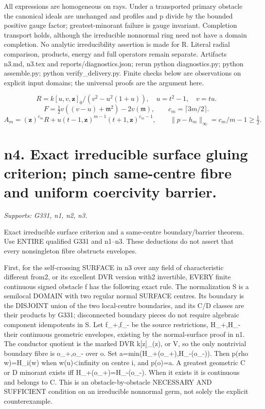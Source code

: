 \documentclass[11pt]{article}
\begin{document}
All expressions are homogeneous on rays. Under a transported primary obstacle the canonical ideals are unchanged and profiles and p divide by the bounded positive gauge factor; greatest-minorant failure is gauge invariant. Completion transport holds, although the irreducible nonnormal ring need not have a domain completion. No analytic irreducibility assertion is made for R. Literal radial comparison, products, energy and full operators remain separate. Artifacts n3.md, n3.tex and reports/diagnostics.json; rerun python diagnostics.py; python assemble.py; python verify\_delivery.py. Finite checks below are observations on explicit input domains; the universal proofs are the argument here.

\[
 R=k[u,v,\mathbf z]_0/(v^2-u^2(1+u)),\quad u=t^2-1,\quad v=tu.
\]
\[
 F=\tfrac12v((v-u)+\mathfrak m^2)-2v(\mathfrak m),\qquad
 c_m=\lceil3m/2\rceil.
\]
\[
 A_m=(\mathbf z)^{c_m}R+u(t-1,\mathbf z)^{m-1}(t+1,\mathbf z)^{c_m-1},
 \qquad\|p-h_m\|_\infty=c_m/m-1\ge\tfrac12.
\]


\section{n4. Exact irreducible surface gluing criterion; pinch same-centre fibre and uniform coercivity barrier.}
\textit{Supports: G331, n1, n2, n3.}

Exact irreducible surface criterion and a same-centre boundary/barrier theorem. Use ENTIRE qualified G331 and n1--n3. These deductions do not assert that every nonsingleton fibre obstructs envelopes.

First, for the self-crossing SURFACE in n3 over any field of characteristic different from2, or its excellent DVR version with2 invertible, EVERY finite continuous signed obstacle f has the following exact rule. The normalization S is a semilocal DOMAIN with two regular normal SURFACE centres. Its boundary is the DISJOINT union of the two local-centre boundaries, and its C/D classes are their products by G331; disconnected boundary pieces do not require algebraic component idempotents in S. Let f\_+,f\_- be the source restrictions, H\_+,H\_- their continuous geometric envelopes, existing by the normal-surface proof in n1. The conductor quotient is the marked DVR k[z]\_(z), or V, so the only nontrivial boundary fibre is o\_+,o\_- over o. Set a=min(H\_+(o\_+),H\_-(o\_-)). Then
p(rho w)=H\_i(w) when w(u)\textless{}infinity on centre i, and p(o)=a.
A greatest geometric C or D minorant exists iff H\_+(o\_+)=H\_-(o\_-). When it exists it is continuous and belongs to C. This is an obstacle-by-obstacle NECESSARY AND SUFFICIENT condition on an irreducible nonnormal germ, not solely the explicit counterexample.
\end{document}
